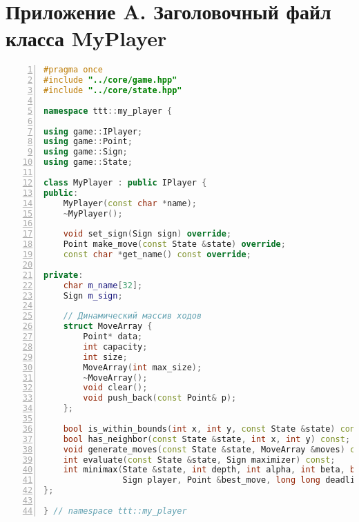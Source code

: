 \section*{Приложение A. Заголовочный файл класса MyPlayer }

\begin{lstlisting}[language=C++,caption={Заголовочный файл класса MyPlayer},label={lst:move_array},numbers=left]
#pragma once
#include "../core/game.hpp"
#include "../core/state.hpp"

namespace ttt::my_player {

using game::IPlayer;
using game::Point;
using game::Sign;
using game::State;

class MyPlayer : public IPlayer {
public:
    MyPlayer(const char *name);
    ~MyPlayer();

    void set_sign(Sign sign) override;
    Point make_move(const State &state) override;
    const char *get_name() const override;

private:
    char m_name[32];
    Sign m_sign;

    // Динамический массив ходов
    struct MoveArray {
        Point* data;
        int capacity;
        int size;
        MoveArray(int max_size);
        ~MoveArray();
        void clear();
        void push_back(const Point& p);
    };

    bool is_within_bounds(int x, int y, const State &state) const;
    bool has_neighbor(const State &state, int x, int y) const;
    void generate_moves(const State &state, MoveArray &moves) const;
    int evaluate(const State &state, Sign maximizer) const;
    int minimax(State &state, int depth, int alpha, int beta, bool maximizing,
                Sign player, Point &best_move, long long deadline) const;
};

} // namespace ttt::my_player
\end{lstlisting}